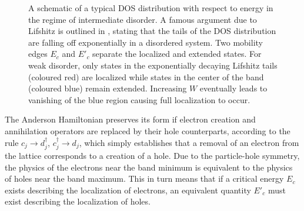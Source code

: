 \documentclass[10pt,a4paper]{article}
\begin{document}
\begin{minipage}[t]{0.5\textwidth}
\begin{figure}[H]
\caption{A schematic of a typical DOS distribution with respect to energy in the regime of intermediate disorder. A famous argument due to Lifshitz is outlined in \cite[~Section 4.2]{Kramer}, stating that the tails of the DOS distribution are falling off exponentially in a disordered system. Two mobility edges $E_c$ and $E'_c$ separate the localized and extended states. For weak disorder, only states in the exponentially decaying Lifshitz tails (coloured red) are localized while states in the center of the band (coloured blue) remain extended. Increasing $W$ eventually leads to vanishing of the blue region causing full localization to occur.  }
\label{fig:DOS} 
\end{figure}
\end{minipage}
The Anderson Hamiltonian preserves its form if electron creation and annihilation operators are replaced by their hole counterparts, according to the rule $c_j\rightarrow d_j^\dagger$, $c_j^\dagger \rightarrow d_j$, which simply establishes that a removal of an electron from the lattice corresponds to a creation of a hole. Due to the particle-hole symmetry, the physics of the electrons near the band minimum is equivalent to the physics of holes near the band maximum. This in turn means that if a critical energy $E_c$ exists describing the localization of electrons, an equivalent quantity $E'_c$ must exist describing the localization of holes. 
\end{document}
